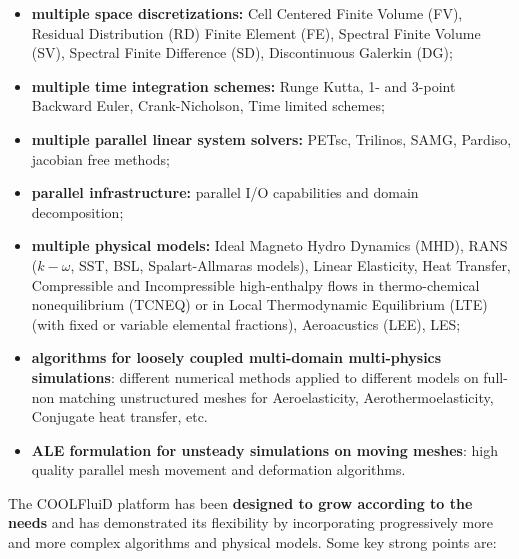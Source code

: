 \documentclass[11pt]{article}
\begin{document}
\begin{itemize}
\item 
  {\bf multiple space discretizations:} Cell Centered Finite Volume (FV),  Residual Distribution (RD)
    Finite Element (FE), Spectral Finite Volume (SV), Spectral Finite Difference (SD), 
    Discontinuous Galerkin (DG);
  \item 
    {\bf multiple time integration schemes:} Runge Kutta, 1- and 3-point Backward Euler, Crank-Nicholson, Time limited schemes;
  \item
    {\bf multiple parallel linear system solvers:} PETsc, Trilinos, SAMG, Pardiso, jacobian free methods;
  \item
    {\bf parallel infrastructure:} parallel I/O capabilities and domain decomposition;
  \item 
    {\bf multiple physical models:} Ideal Magneto Hydro Dynamics (MHD), RANS ($k-\omega$, SST, BSL, Spalart-Allmaras models),
    Linear Elasticity, Heat Transfer, Compressible and Incompressible high-enthalpy flows in
    thermo-chemical nonequilibrium (TCNEQ) or in Local Thermodynamic Equilibrium (LTE)
    (with fixed or variable elemental fractions), Aeroacustics (LEE), LES;
  \item
    {\bf algorithms for loosely coupled multi-domain multi-physics simulations}: 
    different numerical methods applied to different models on full-non matching unstructured meshes 
    for Aeroelasticity, Aerothermoelasticity, Conjugate heat transfer, etc.
  \item
    {\bf ALE formulation for unsteady simulations on moving meshes}: high quality parallel mesh movement 
    and deformation algorithms.
  \end{itemize}
  The COOLFluiD platform has been {\bf designed to grow according to the needs} and has demonstrated its flexibility
  by incorporating progressively more and more complex algorithms and physical models. Some key strong points are:
  
\end{document}
